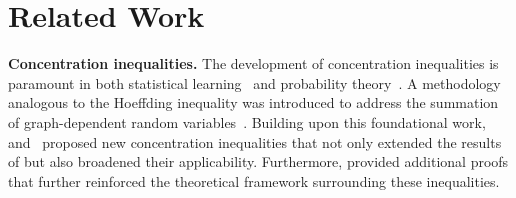 \section{Related Work}
\textbf{Concentration inequalities.}
The development of concentration inequalities \cite{concentration13initial} is paramount in both statistical learning~\cite{statistics97} and probability theory~\cite{07probability}. A methodology analogous to the Hoeffding inequality was introduced to address the summation of graph-dependent random variables~\cite{jason04}. Building upon this foundational work, \citet{usunier2005generalization} and~\citet{ralaivola2015entropy} proposed new concentration inequalities that not only extended the results of \cite{jason04} but also broadened their applicability. Furthermore, \citet{ruiray22} provided additional proofs that further reinforced the theoretical framework surrounding these inequalities.

